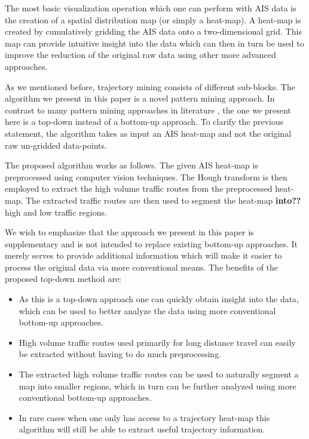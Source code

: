 \documentclass{article}
\begin{document}
The most basic visualization operation which one can perform with AIS data is the creation of a spatial distribution map (or simply a heat-map). A heat-map 
is created by cumulatively gridding the AIS data onto a two-dimensional grid. This map can provide 
intuitive insight into the data which can then in turn be used to improve the reduction of the original raw data using other more advanced approaches.

As we mentioned before, trajectory mining consists of different sub-blocks. The algorithm we present in this paper is a novel pattern mining approach. In contrast to many 
pattern mining approaches in literature \cite{zheng2015}, the one we present here is a top-down instead of a bottom-up approach. To clarify the previous statement, the algorithm 
takes as input an AIS heat-map and not the original raw un-gridded data-points.

The proposed algorithm works as follows. The given AIS heat-map is preprocessed using computer vision techniques. The Hough transform is then employed to extract the high volume traffic routes from the preprocessed heat-map. The extracted traffic routes are then used to segment the 
heat-map \textbf{into??} high and low traffic regions.

We wish to emphasize that the approach we present in this paper is supplementary and is not intended to replace existing bottom-up approaches. It merely serves to provide additional information 
which will make it easier to process the original data via more conventional means.
The benefits of the proposed top-down method are:
\begin{itemize}
 \item As this is a top-down approach one can quickly obtain insight into the data, which can be used to better analyze the data using more conventional bottom-up approaches.
 \item High volume traffic routes used primarily for long distance travel can easily be extracted without having to do much preprocessing. 
 \item The extracted high volume traffic routes can be used to naturally segment a map into smaller regions, which in turn can be further analyzed using more conventional bottom-up approaches.
 \item In rare cases when one only has access to a trajectory heat-map this algorithm will still be able to extract useful trajectory information.
 \end{itemize}
 
\end{document}
